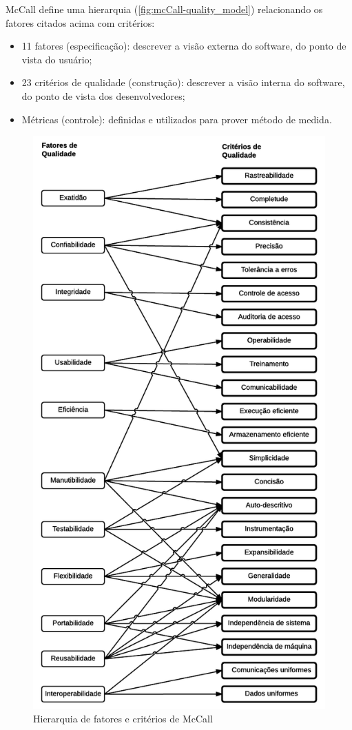 \documentclass[
	12pt,				%
	openright,			%
	oneside,			%
	a4paper,			%
	english,			%
	brazil,				%
	]{abntex2}
\begin{document}
McCall define uma hierarquia (\autoref{fig:mcCall-quality_model}) relacionando os fatores citados acima com critérios:
\begin{itemize}
    \item 11 fatores (especificação): descrever a visão externa do software, do ponto de vista do usuário;
    \item 23 critérios de qualidade (construção): descrever a visão interna do software, do ponto de vista dos desenvolvedores;
    \item Métricas (controle): definidas e utilizados para prover método de medida.
\end{itemize}

\begin{figure}[H]
    \centering
    \caption{Hierarquia de fatores e critérios de McCall}
    \graphicspath{ {./graphics/} }
    \includegraphics[scale=0.85]{mcCall-graph-andrei}

\end{figure}
\end{document}
